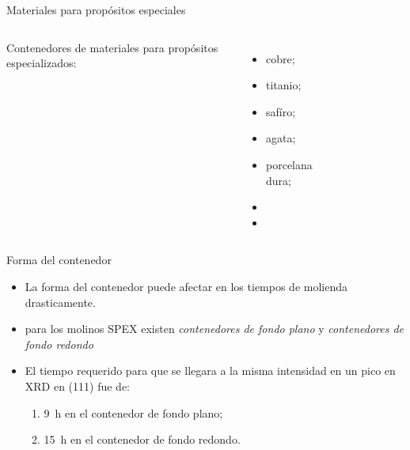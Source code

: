 \documentclass[%
spanish,
    progressbar=head,
background=dark,
subsectionpage
]{beamer}
\begin{document}
\begin{frame}{Materiales para propósitos especiales}
    \begin{columns}
        \small
    Contenedores de materiales para propósitos especializados:
    \begin{itemize}
        \item<1-> cobre;
        \item<2-> titanio;
        \item<3-> safíro;
        \item<4-> agata;
        \item<5-> porcelana dura;
        \item<6-> 
        \item<7-> 
    \end{itemize}
    \begin{figure}
        \begin{center}
        \begin{overprint}
        \end{overprint}
        \end{center}
    \end{figure}
    \end{columns}
\end{frame}

\begin{frame}{Forma del contenedor}
\begin{itemize}
    \item<1-> La forma del contenedor puede afectar en los tiempos de molienda drasticamente.
    \item<2-> para los molinos SPEX existen \emph{contenedores de fondo plano} y \emph{contenedores de fondo redondo}
    \item<3-> El tiempo requerido para que se llegara a la misma intensidad en un pico en XRD en (111) fue de:
    \begin{enumerate}
        \item \qty{9}{\hour} en el contenedor de fondo plano;
        \item \qty{15}{\hour} en el contenedor de fondo redondo.
    \end{enumerate}
\end{itemize}
\end{frame}
\end{document}
